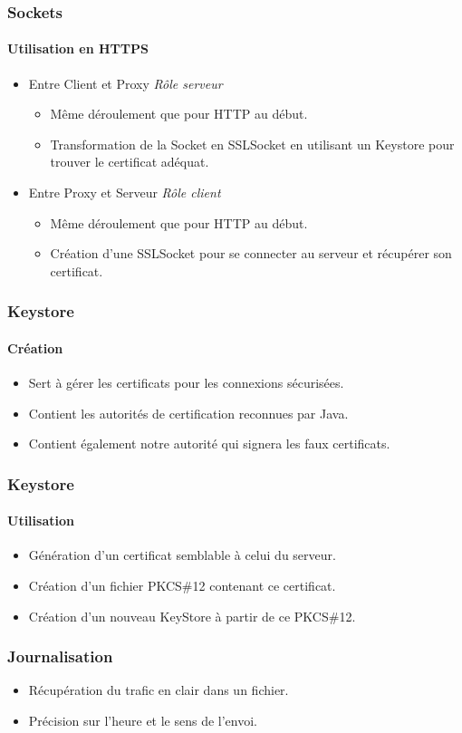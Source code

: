 	\begin{frame}
		\frametitle{Sockets}	
		\framesubtitle{Utilisation en HTTPS}
		\begin{itemize}
			\item Entre Client et Proxy \textit{Rôle serveur}
			\begin{itemize}
				\item Même déroulement que pour HTTP au début.
				\item Transformation de la Socket en SSLSocket en utilisant un Keystore pour trouver le certificat adéquat.
			\end{itemize}
			\item Entre Proxy et Serveur \textit{Rôle client}
			\begin{itemize}
				\item Même déroulement que pour HTTP au début.
				\item Création d'une SSLSocket pour se connecter au serveur et récupérer son certificat.
			\end{itemize}
		\end{itemize}
	\end{frame}

	\begin{frame}
		\frametitle{Keystore}
		\framesubtitle{Création}
		\begin{itemize}
			\item Sert à gérer les certificats pour les connexions sécurisées.
			\item Contient les autorités de certification reconnues par Java.
			\item Contient également notre autorité qui signera les faux certificats.
		\end{itemize}
	\end{frame} 
	
 		\begin{frame}
		\frametitle{Keystore}
		\framesubtitle{Utilisation}
		\begin{itemize}
			\item Génération d'un certificat semblable à celui du serveur.
			\item Création d'un fichier PKCS\#12 contenant ce certificat.
			\item Création d'un nouveau KeyStore à partir de ce PKCS\#12.
		\end{itemize}				
	\end{frame}
	
	\begin{frame}
		\frametitle{Journalisation}
		\begin{itemize}
			\item Récupération du trafic en clair dans un fichier.
			\item Précision sur l'heure et le sens de l'envoi.
		\end{itemize}				
	\end{frame} 
	
	